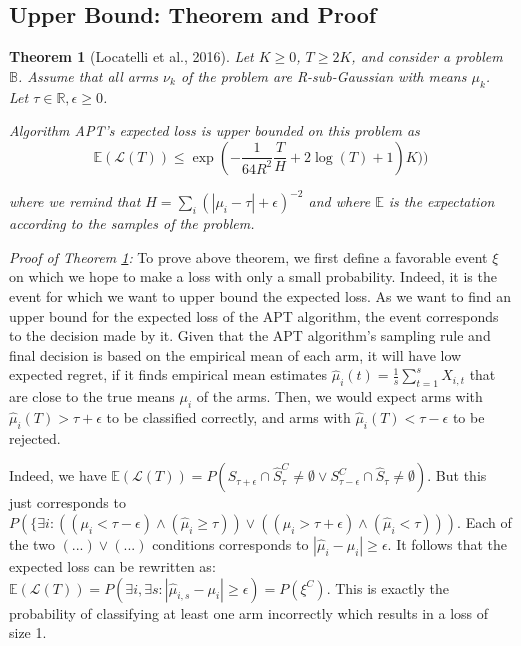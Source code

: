 \documentclass[12pt,]{article}
\newtheorem{theorem}{Theorem}
\begin{document}
\subsection{Upper Bound: Theorem and
Proof}\label{upper-bound-theorem-and-proof}

\begin{theorem}[Locatelli et al., 2016] \label{theorem:LocatelliTheorem4}
Let $K \geq 0$, $T \geq 2K$, and consider a problem $\mathbb{B}$. Assume that
all arms $\nu_k$ of the problem are R-sub-Gaussian with means $\mu_k$. Let $\tau
\in \mathbb{R}, \epsilon \geq 0$.

Algorithm APT's expected loss is upper bounded on this problem as 
\begin{equation*} \mathbb{E}(\mathcal{L}(T)) \leq \exp
(-\frac{1}{64R^2}\frac{T}{H} + 2 \log (T) + 1)K)) \end{equation*}

where we remind that $H = \sum_i (|\mu_i - \tau | + \epsilon)^{-2}$ and where
$\mathbb{E}$ is the expectation according to the samples of the problem.
\end{theorem}

\emph{Proof of Theorem \ref{theorem:LocatelliTheorem4}:} To prove above
theorem, we first define a favorable event \(\xi\) on which we hope to
make a loss with only a small probability. Indeed, it is the event for
which we want to upper bound the expected loss. As we want to find an
upper bound for the expected loss of the APT algorithm, the event
corresponds to the decision made by it. Given that the APT algorithm's
sampling rule and final decision is based on the empirical mean of each
arm, it will have low expected regret, if it finds empirical mean
estimates \(\hat{\mu}_i(t) = \frac{1}{s} \sum_{t=1}^s X_{i,t}\) that are
close to the true means \(\mu_i\) of the arms. Then, we would expect
arms with \(\hat{\mu}_i(T) > \tau + \epsilon\) to be classified
correctly, and arms with \(\hat{\mu}_i(T) < \tau - \epsilon\) to be
rejected.

Indeed, we have
\(\mathbb{E}(\mathcal{L}(T)) = P(S_{\tau + \epsilon} \cap \hat{S}_\tau^C \neq \emptyset \lor S_{\tau-\epsilon}^C \cap \hat{S}_{\tau} \neq \emptyset)\).
But this just corresponds to
\(P(\{\exists i: ((\mu_i < \tau-\epsilon) \land(\hat{\mu}_i \geq \tau)) \lor ((\mu_i > \tau + \epsilon) \land (\hat{\mu}_i < \tau)))\).
Each of the two \((...)\lor(...)\) conditions corresponds to
\(| \hat{\mu}_i - \mu_i | \geq \epsilon\). It follows that the expected
loss can be rewritten as:
\(\mathbb{E}(\mathcal{L}(T)) = P(\exists i, \exists s: |\hat{\mu}_{i,s} - \mu_i | \geq \epsilon) = P(\xi^C)\).
This is exactly the probability of classifying at least one arm
incorrectly which results in a loss of size 1.
\end{document}
